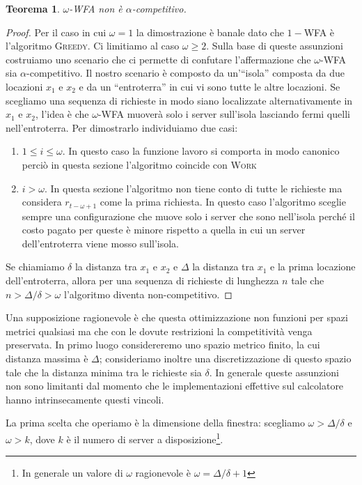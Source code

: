 \documentclass[a4paper, 10pt]{article}
\begin{document}
\newtheorem{noncomp}{Teorema} 
\begin{noncomp}
$\omega$-WFA non è $\alpha$-competitivo.
\end{noncomp}
\begin{proof}
Per il caso in cui $\omega = 1$ la dimostrazione è banale dato
che $1-$WFA è l'algoritmo \textsc{Greedy}. Ci limitiamo al caso $\omega \geq 2$.
Sulla base di queste assunzioni costruiamo uno scenario che ci permette di 
confutare l'affermazione che $\omega$-WFA sia $\alpha$-competitivo. Il nostro 
scenario è composto da un'``isola'' composta da due locazioni $x_1$ e $x_2$ e 
da un ``entroterra'' in cui vi sono tutte le altre locazioni. Se scegliamo una 
sequenza di richieste in modo siano localizzate alternativamente in $x_1$ e 
$x_2$, l'idea è che $\omega$-WFA muoverà solo i server sull'isola lasciando fermi 
quelli nell'entroterra. Per dimostrarlo individuiamo due casi:
\begin{enumerate}
    \item $1 \leq i \leq \omega$. In questo caso la funzione lavoro si comporta in 
    modo canonico perciò in questa sezione l'algoritmo coincide con 
    \textsc{Work} 
    \item $i > \omega$. In questa sezione l'algoritmo non tiene conto di tutte le 
    richieste ma considera $r_{t - \omega + 1}$ come la prima richiesta. In questo 
    caso l'algoritmo sceglie sempre una configurazione che muove solo i server 
    che sono nell'isola perché il costo pagato per queste è minore rispetto a 
    quella in cui un server dell'entroterra viene mosso sull'isola. 
\end{enumerate}
Se chiamiamo $\delta$ la distanza tra $x_1$ e $x_2$ e $\Delta$ la distanza tra 
$x_1$ e la prima locazione dell'entroterra, allora per una sequenza di richieste
di lunghezza $n$ tale che $n > \Delta / \delta > \omega$ l'algoritmo diventa 
non-competitivo.
\end{proof}

Una supposizione ragionevole è che questa ottimizzazione non funzioni per spazi
metrici qualsiasi ma che con le dovute restrizioni la competitività venga preservata.
In primo luogo considereremo uno spazio metrico finito, la cui distanza massima è $\Delta$;  consideriamo inoltre una discretizzazione di questo spazio tale che la distanza minima tra le richieste sia $\delta$. In generale queste assunzioni non sono limitanti dal momento che 
le implementazioni effettive sul calcolatore hanno intrinsecamente questi vincoli.

La prima scelta che operiamo è la dimensione della finestra: 
scegliamo $\omega > \Delta/\delta$ e $\omega > k$, dove $k$ è il numero di 
server a disposizione\footnote{In generale un valore di $\omega$ ragionevole
è $\omega = \Delta / \delta + 1$}. 
\end{document}
